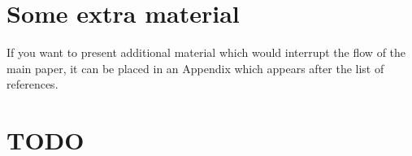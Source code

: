 \documentclass[fleqn,usenatbib]{mnras}
\begin{document}
\appendix

\section{Some extra material}

If you want to present additional material which would interrupt the flow of the main paper,
it can be placed in an Appendix which appears after the list of references.

\clearpage

\section{TODO}
\listoftodos

\bsp	%
\label{lastpage}
\end{document}
